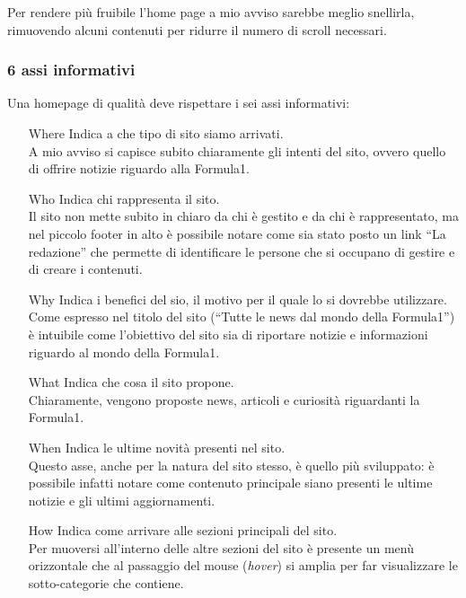 Per rendere più fruibile l'home page a mio avviso sarebbe meglio snellirla,
rimuovendo alcuni contenuti per ridurre il numero di scroll necessari.

\subsubsection{6 assi informativi}

Una homepage di qualit\`a deve rispettare i sei assi informativi:
\begin{itemize}

\item[Where] Indica a che tipo di sito siamo arrivati. \\
  A mio avviso si capisce subito chiaramente gli intenti del sito, ovvero quello
  di offrire notizie riguardo alla Formula1.

\item[Who] Indica chi rappresenta il sito. \\
  Il sito non mette subito in chiaro da chi \`e gestito e da chi \`e
  rappresentato, ma nel piccolo footer in alto \`e possibile notare come sia
  stato posto un link ``La redazione'' che permette di identificare le persone
  che si occupano di gestire e di creare i contenuti.

\item[Why] Indica i benefici del sio, il motivo per il quale lo si dovrebbe
  utilizzare. \\
  Come espresso nel titolo del sito (``Tutte le news dal mondo della Formula1'')
  \`e intuibile come l'obiettivo del sito sia di riportare notizie e
  informazioni riguardo al mondo della Formula1.

\item[What] Indica che cosa il sito propone. \\
  Chiaramente, vengono proposte news, articoli e curiosit\`a riguardanti la
  Formula1.

\item[When] Indica le ultime novit\`a presenti nel sito. \\
  Questo asse, anche per la natura del sito stesso, \`e quello pi\`u sviluppato:
  \`e possibile infatti notare come contenuto principale siano presenti le
  ultime notizie e gli ultimi aggiornamenti.

\item[How] Indica come arrivare alle sezioni principali del sito. \\
  Per muoversi all'interno delle altre sezioni del sito \`e presente un men\`u
  orizzontale che al passaggio del mouse (\textit{hover}) si amplia per far
  visualizzare le sotto-categorie che contiene.
  
  
\end{itemize}
